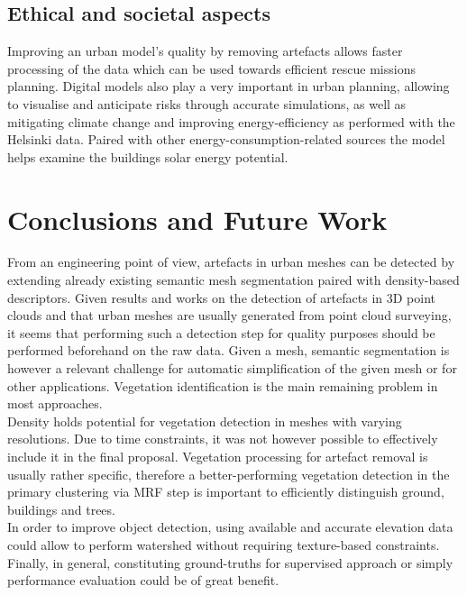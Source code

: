 \documentclass{kththesis}
\begin{document}
\section{Ethical and societal aspects}
Improving an urban model's quality by removing artefacts allows faster processing of the data which can be used towards efficient rescue missions planning. Digital models also play a very important in urban planning, allowing to visualise and anticipate risks through accurate simulations, as well as mitigating climate change and improving energy-efficiency as performed with the Helsinki data. Paired with other energy-consumption-related sources the model helps examine the buildings solar energy potential. 
\chapter{Conclusions and Future Work} 


From an engineering point of view, artefacts in urban meshes can be detected by extending already existing semantic mesh segmentation paired with density-based descriptors. Given results and works on the detection of artefacts in 3D point clouds and that urban meshes are usually generated from point cloud surveying, it seems that performing such a detection step for quality purposes should be performed beforehand on the raw data. Given a mesh, semantic segmentation is however a relevant challenge for automatic simplification of the given mesh or for other applications. Vegetation identification is the main remaining problem in most approaches. \\ 

Density holds potential for vegetation detection in meshes with varying resolutions. Due to time constraints, it was not however possible to effectively include it in the final proposal. Vegetation processing for artefact removal is usually rather specific, therefore a better-performing vegetation detection in the primary clustering via MRF step is important to efficiently distinguish ground, buildings and trees. \\
In order to improve object detection, using available and accurate elevation data could allow to perform watershed without requiring texture-based constraints. Finally, in general, constituting ground-truths for supervised approach or simply performance evaluation could be of great benefit. 
\end{document}
